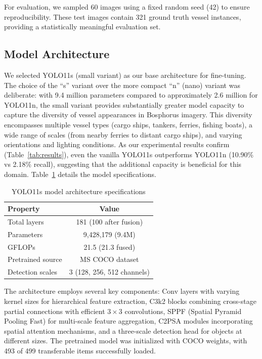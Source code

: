 \documentclass[pdflatex,sn-mathphys-num,Numbered]{sn-jnl}
\begin{document}
For evaluation, we sampled 60 images using a fixed random seed (42) to ensure reproducibility. These test images contain 321 ground truth vessel instances, providing a statistically meaningful evaluation set.

\subsection{Model Architecture}\label{subsec:architecture}

We selected YOLO11s (small variant) as our base architecture for fine-tuning. The choice of the ``s'' variant over the more compact ``n'' (nano) variant was deliberate: with 9.4 million parameters compared to approximately 2.6 million for YOLO11n, the small variant provides substantially greater model capacity to capture the diversity of vessel appearances in Bosphorus imagery. This diversity encompasses multiple vessel types (cargo ships, tankers, ferries, fishing boats), a wide range of scales (from nearby ferries to distant cargo ships), and varying orientations and lighting conditions. As our experimental results confirm (Table~\ref{tab:results}), even the vanilla YOLO11s outperforms YOLO11n (10.90\% vs 2.18\% recall), suggesting that the additional capacity is beneficial for this domain. Table~\ref{tab:architecture} details the model specifications.

\begin{table}[!ht]
\centering
\caption{YOLO11s model architecture specifications}\label{tab:architecture}
\begin{tabular}{lc}
\toprule
\textbf{Property} & \textbf{Value} \\
\midrule
Total layers & 181 (100 after fusion) \\
Parameters & 9,428,179 (9.4M) \\
GFLOPs & 21.5 (21.3 fused) \\
Pretrained source & MS COCO dataset \\
Detection scales & 3 (128, 256, 512 channels) \\
\bottomrule
\end{tabular}
\end{table}

The architecture employs several key components: Conv layers with varying kernel sizes for hierarchical feature extraction, C3k2 blocks combining cross-stage partial connections with efficient $3 \times 3$ convolutions, SPPF (Spatial Pyramid Pooling Fast) for multi-scale feature aggregation, C2PSA modules incorporating spatial attention mechanisms, and a three-scale detection head for objects at different sizes. The pretrained model was initialized with COCO weights, with 493 of 499 transferable items successfully loaded.
\end{document}
